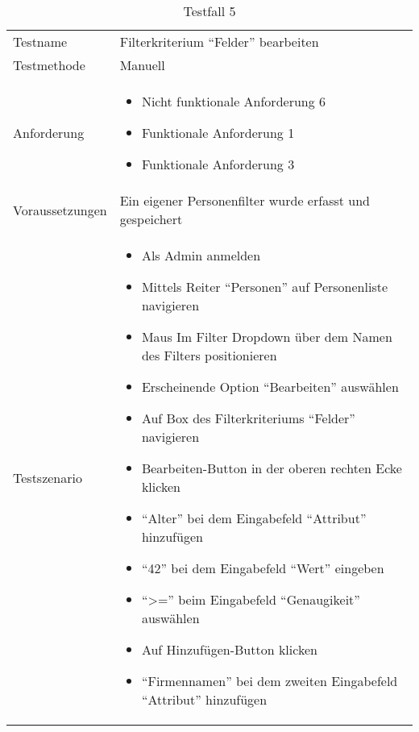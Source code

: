 \begin{table}[h!]
   \begin{tabular}{|L{0.4\textwidth}|L{0.6\textwidth}|}
       \hline
         \\[12pt]
       \hline
        Testname & Filterkriterium ``Felder'' bearbeiten \\
       \hline
       Testmethode & Manuell \\
       \hline
        Anforderung & 
        \begin{itemize}
         \item Nicht funktionale Anforderung 6
         \item Funktionale Anforderung 1
         \item Funktionale Anforderung 3
         \end{itemize}  \\
       \hline
       Voraussetzungen & Ein eigener Personenfilter wurde erfasst und gespeichert \\
       \hline
       Testszenario & 
       \begin{itemize}
         \item Als Admin anmelden
         \item Mittels Reiter ``Personen'' auf Personenliste navigieren
         \item Maus Im Filter Dropdown über dem Namen des Filters positionieren
         \item Erscheinende Option ``Bearbeiten'' auswählen
         \item Auf Box des Filterkriteriums ``Felder'' navigieren
         \item Bearbeiten-Button in der oberen rechten Ecke klicken
         \item ``Alter'' bei dem Eingabefeld ``Attribut'' hinzufügen
         \item ``42'' bei dem Eingabefeld ``Wert'' eingeben
         \item ``\textgreater='' beim Eingabefeld ``Genaugikeit'' auswählen
         \item Auf Hinzufügen-Button klicken
         \item ``Firmennamen'' bei dem zweiten Eingabefeld ``Attribut'' hinzufügen
       \end{itemize} \\
       \hline
     \end{tabular}
     \caption{Testfall 5}
\end{table}

